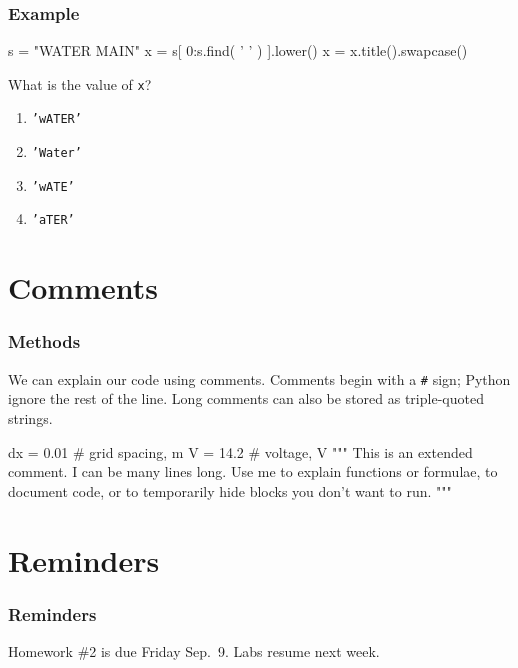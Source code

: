 \documentclass[11pt]{beamer}
\begin{document}
\begin{frame}[fragile]
  \frametitle{Example}
  \Enlarge

  \begin{semiverbatim}
s = "WATER MAIN"
x = s[ 0:s.find( ' ' ) ].lower()
x = x.title().swapcase()
  \end{semiverbatim}
  What is the value of \texttt{x}?
  \begin{enumerate}[label=\Alph*]
  \item  \texttt{'wATER'}
  \item  \texttt{'Water'}
  \item  \texttt{'wATE'}
  \item  \texttt{'aTER'}
  \end{enumerate}
\end{frame}

\section{Comments}

\begin{frame}[fragile]
  \frametitle{Methods}
  \Enlarge

  \begin{itemize}
  \myitem  We can explain our code using comments. %
  \myitem  Comments begin with a \texttt{\#} sign; Python ignore the rest of the line. %
  \myitem  Long comments can also be stored as triple-quoted strings. %
    \begin{semiverbatim}
dx = 0.01  # grid spacing, m
V  = 14.2  # voltage, V
"""
This is an extended comment.
I can be many lines long.
Use me to explain functions or formulae, to document code,
or to temporarily hide blocks you don't want to run.
"""
    \end{semiverbatim}
  \end{itemize}
\end{frame}

\section{Reminders}

\begin{frame}
  \frametitle{Reminders}
  \Enlarge

  \begin{itemize}
  \myitem  Homework \#2 is due Friday Sep.\ 9.
  \myitem  Labs resume next week.
  \end{itemize}
\end{frame}
\end{document}

